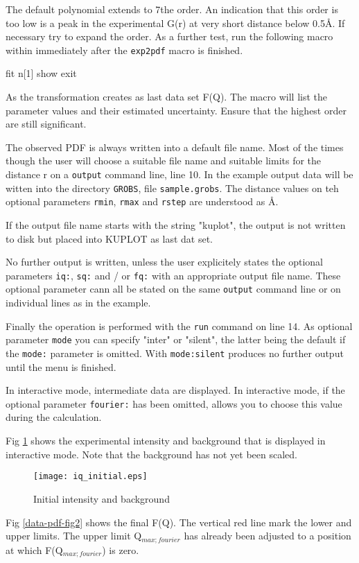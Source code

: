 The default polynomial extends to 7the order. An indication that this order 
is too low is a peak in the experimental G(r) at very short distance below 0.5\AA{}.
If necessary try to expand the order. As a further test, run the following macro
within \Kuplot immediately after the {\tt exp2pdf} macro is finished.
 
\begin{MacVerbatim}
fit n[1]
show
exit
\end{MacVerbatim}

As the transformation creates as last \Kuplot data set F(Q). The macro will
list the parameter values and their estimated uncertainty. Ensure that the 
highest order are still significant.

The observed PDF is always written into a default file name. Most of the
times though the user will choose a suitable file name and suitable 
limits for the distance r on a {\tt output} command line, line 10. In the 
example output data will be witten into the directory {\tt GROBS}, 
file {\tt sample.grobs}. The distance values on teh optional parameters
{\tt rmin}, {\tt rmax} and {\tt rstep} are understood as \AA{}.

If the output file name starts with the string "kuplot", the output is not
written to disk but placed into KUPLOT as last dat set.

No further output is written, unless the user explicitely states the
optional parameters {\tt iq:}, {\tt sq:} and / or {\tt fq:} with an 
appropriate output file name. These optional parameter cann all be stated on the 
same {\tt output} command line or on individual lines as in the example.

Finally the operation is performed with the {\tt run} command on line 14.
As optional parameter {\tt mode} you can specify "inter" or "silent", the 
latter being the default if the {\tt mode:} parameter is omitted. With 
{\tt mode:silent} \Discus produces no further output until the menu is finished. 

In interactive mode, intermediate data are displayed. In interactive mode,
if the optional parameter {\tt fourier:} has been omitted, \Discus allows you to 
choose this value during the calculation.

Fig \ref{data-pdf-fig1} shows the experimental intensity and background that
is displayed in interactive mode. Note that the background has not yet been scaled.
%
\begin{figure}[!b]
   \centering
   \texttt{[image: iq\_initial.eps]}
   \vspace*{+5mm} 
   \caption{Initial intensity and background}
   \label{data-pdf-fig1}
\end{figure}
%
Fig \ref{data-pdf-fig2} shows the final F(Q). The vertical red line mark the
lower and upper limits. The upper limit Q$_{max;fourier}$ has already been 
adjusted to a position at which F(Q$_{max;fourier}$) is zero.

